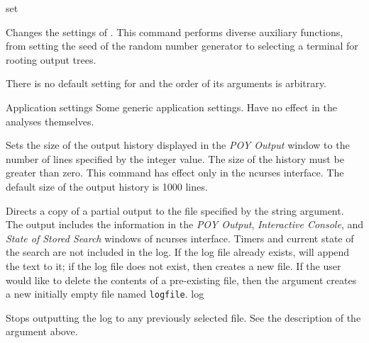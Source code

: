 \begin{command}{set}{}


	\begin{poydescription}
            Changes the settings of \poy. This command performs diverse auxiliary 
            functions, from setting the seed of the random number generator to
            selecting a terminal for rooting output trees.
            
            There is no default setting for  and the order of its
            arguments is arbitrary.
            
	\end{poydescription}

	\begin{arguments}

        \begin{argumentgroup}{Application settings}
            {Some generic application settings. Have no effect in the analyses
            themselves.}

                {Sets the size of the \poy output history displayed in the
                \emph{POY Output} window to the number of lines specified by the
                integer value. The size of the history must be greater than
                zero. This command has effect only in the ncurses interface. The
                default size of the output history is 1000 lines.}
                 {}

                {Directs a copy of a partial output to the file specified by the
                string  argument. The output includes the  information in the
                \emph{POY Output}, \emph{Interactive Console}, and \emph{State
                of Stored Search} windows of ncurses interface.  Timers and
                current state of the search are not included in the log. If the
                log
                file already exists, \poy will append the text to it; if the log
                file does not exist, then \poy creates a new file. If the user
                would like to delete the contents of a pre-existing file, then
                the argument  creates a new
                initially empty file named \texttt{logfile}.}
                {log}

                {Stops outputting the log to any previously selected
                file. See the description of the argument 
                above.}
                {}


\end{argumentgroup}
\end{arguments}
\end{command}
